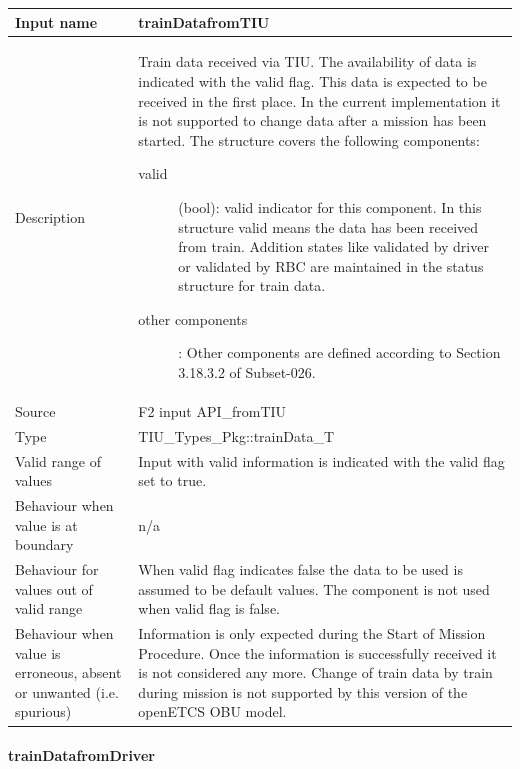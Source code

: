 \begin{longtable}{p{}p{}}
\toprule
Input name				& trainDatafromTIU \\
\midrule
Description				& Train data received via TIU. The availability of data is indicated with the valid flag. This data is expected to be received in the first place. In the current implementation it is not supported to change data after a mission has been started.  The structure covers the following components:
\begin{description}
\item[valid](bool): valid indicator for this component. In this structure valid means the data has been received from train. Addition states like validated by driver or validated by RBC are maintained in the status structure for train data.
\item[other components]:  Other components are defined according to Section 3.18.3.2 of Subset-026. 
\end{description} \\
\midrule
Source					& F2 input API\_fromTIU\\ 
\midrule
Type					& TIU\_Types\_Pkg::trainData\_T \\
\midrule
Valid range of values	& Input with valid information is indicated with the valid flag set to true. 
\\
\midrule
Behaviour when value is at boundary	& n/a\\
\midrule
Behaviour for values out of valid range	& When valid flag indicates false the data to be used is assumed to be default values. The component is not used when valid flag is false.\\
\midrule
Behaviour when value is erroneous, absent or unwanted (i.e. spurious) & Information is only expected during the Start of Mission Procedure. Once the information is successfully received it is not considered any more. Change of train data by train during mission is not supported by this version of the openETCS OBU model.\\
\bottomrule
\end{longtable}

\paragraph{trainDatafromDriver}

